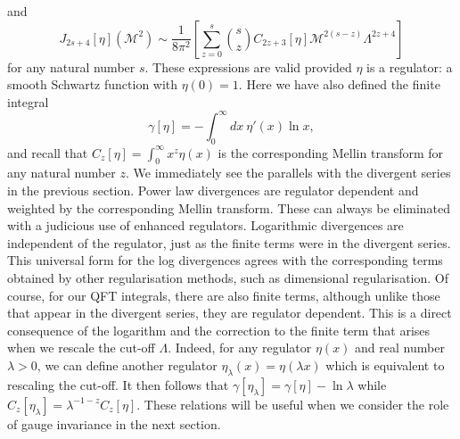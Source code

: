 \documentclass[11pt, letter]{article}
\def\be{\begin{equation}}
\def\ee{\end{equation}}
\newcommand{\M}{\mathcal{M}}
\begin{document}
and 
\be
J_{2s+4}[\eta] (\M^2) \sim \frac{1}{8 \pi^2} \left[ \sum_{z=0}^s \binom{s}{z}  C_{2z+3}[\eta]\M^{2(s-z)}\Lambda^{2z+4} \right] \label{asn}
\ee
for any natural number $s$. These expressions are valid provided $\eta$ is a regulator: a smooth Schwartz function with $\eta(0) = 1$. Here we have also defined the  finite integral
\be \label{gammanint}
\gamma[\eta]=-\int_0^\infty dx  \  \eta'(x)  \ln x,
\ee
and recall that $C_z[\eta]=\int_0^\infty x^z \eta(x)$ is the corresponding Mellin transform for  any natural number $z$.  We immediately see the parallels with the divergent series in the previous section. Power law divergences are regulator dependent and weighted by the corresponding Mellin transform. These can always be eliminated with a judicious use of enhanced regulators. Logarithmic divergences are independent of the regulator, just as the finite terms were in the divergent series.  This universal form for the log divergences agrees with the corresponding terms obtained by other regularisation methods, such as dimensional regularisation.  Of course,  for our QFT integrals, there are also finite terms, although unlike those that appear in the divergent series, they are regulator dependent. This is a direct consequence of the logarithm and the correction to the finite term that arises when we rescale the cut-off $\Lambda$.  Indeed, for any regulator $\eta(x)$ and real number $\lambda>0$, we can define another regulator $\eta_\lambda(x)=\eta(\lambda x)$ which is equivalent to rescaling the cut-off. It then follows that $\gamma[\eta_\lambda]=\gamma[\eta]-\ln \lambda$ while $C_z[\eta_\lambda]=\lambda^{-1-z} C_z[\eta]$.  These relations will be useful when we consider the role of gauge invariance in the next section.
\end{document}
